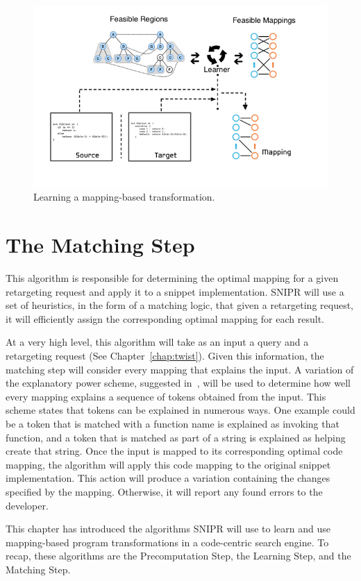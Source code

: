 \begin{figure}[!ht]
    \centering
    \includegraphics[width=\textwidth]{images/mappinggeneration}
    \caption{Learning a mapping-based transformation.}
    \label{fig:mappinggeneration}
\end{figure}

\section{The Matching Step}
\label{sec:matching}

This algorithm is responsible for determining the optimal mapping for a given retargeting request and apply it to a snippet implementation. SNIPR will use a set of heuristics, in the form of a matching logic, that given a retargeting request, it will efficiently assign the corresponding optimal mapping for each result. 

At a very high level, this algorithm will take as an input a query and a retargeting request (See Chapter~\ref{chap:twist}). Given this information, the matching step will consider every mapping that explains the input. A variation of the explanatory power scheme, suggested in~\cite{Little:2008hr}, will be used to determine how well every mapping explains a sequence of tokens obtained from the input. This scheme states that tokens can be explained in numerous ways. One example could be a token that is matched with a function name is explained as invoking that function, and a token that is matched as part of a string is explained as helping create that string. Once the input is mapped to its corresponding optimal code mapping, the algorithm will apply this code mapping to the original snippet implementation. This action will produce a variation containing the changes specified by the mapping. Otherwise, it will report any found errors to the developer. 

This chapter has introduced the algorithms SNIPR will use to learn and use mapping-based program transformations in a code-centric search engine. To recap, these algorithms are the Precomputation Step, the Learning Step, and the Matching Step.
